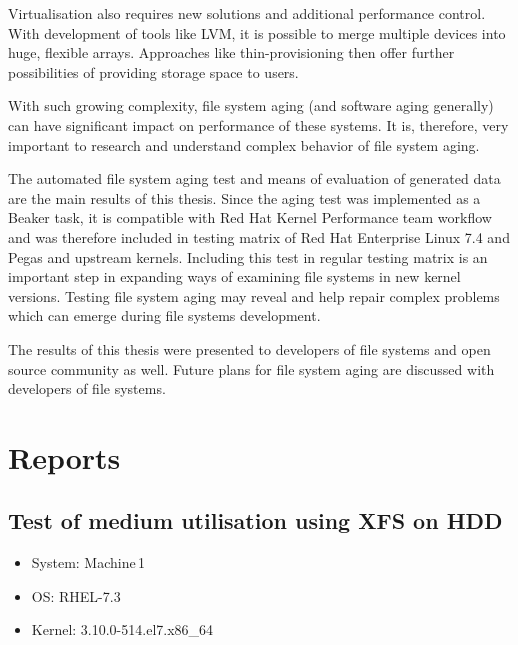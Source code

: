 \documentclass[
  color, %
  table, %
  lof,   %
  lot,   %
]{fithesis3}
\begin{document}

Virtualisation also requires new solutions and additional performance control. With development of tools like LVM, it is possible to merge multiple devices into huge, flexible arrays. Approaches like thin-provisioning then offer further possibilities of providing storage space to users. 

With such growing complexity, file system aging (and software aging generally) can have significant impact on performance of these systems. It is, therefore, very important to research and understand complex behavior of file system aging.

The automated file system aging test and means of evaluation of generated data are the main results of this thesis. Since the aging test was implemented as a Beaker task, it is compatible with Red Hat Kernel Performance team workflow and was therefore included in testing matrix of Red Hat Enterprise Linux 7.4 and Pegas and upstream kernels. Including this test in regular testing matrix is an important step in expanding ways of examining file systems in new kernel versions. Testing file system aging may reveal and help repair complex problems which can emerge during file systems development.

The results of this thesis were presented to developers of file systems and open source community as well. Future plans for file system aging are discussed with developers of file systems.




\printbibliography[heading=bibintoc]















\appendix %
\chapter{Reports}\label{reports}



\section{Test of medium utilisation using XFS on HDD}

\begin{itemize}
\itemsep0em 
   \item System: Machine\,1
   \item OS: RHEL-7.3
   \item Kernel: 3.10.0-514.el7.x86\_64
\end{itemize}
\end{document}
